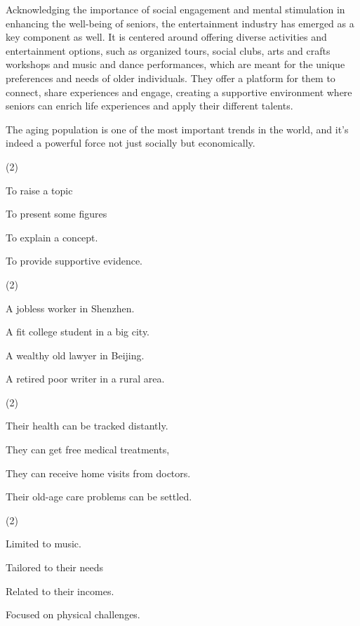 \documentclass{英语试卷}
\begin{document}
\par Acknowledging the importance of social engagement and mental stimulation in enhancing the well-being of seniors, the entertainment industry has emerged as a key component as well. It is centered around offering diverse activities and entertainment options, such as organized tours, social clubs, arts and crafts workshops and music and dance performances, which are meant for the unique preferences and needs of older individuals. They offer a platform for them to connect, share experiences and engage, creating a supportive environment where seniors can enrich life experiences and apply their different talents.\par
\par The aging population is one of the most important trends in the world, and it's indeed a powerful force not just socially but economically.\par
{}
\begin{choices}(2)
  \item To raise a topic
  \item To present some figures
  \item To explain a concept.
  \item To provide supportive evidence.
\end{choices}
\begin{choices}(2)
  \item A jobless worker in Shenzhen.
  \item A fit college student in a big city.
  \item A wealthy old lawyer in Beijing.
  \item A retired poor writer in a rural area.
\end{choices}
\begin{choices}(2)
  \item Their health can be tracked distantly.
  \item They can get free medical treatments,
  \item They can receive home visits from doctors.
  \item Their old-age care problems can be settled.
\end{choices}
\begin{choices}(2)
  \item Limited to music.
  \item Tailored to their needs
  \item Related to their incomes.
  \item Focused on physical challenges.
\end{choices}
\end{document}
